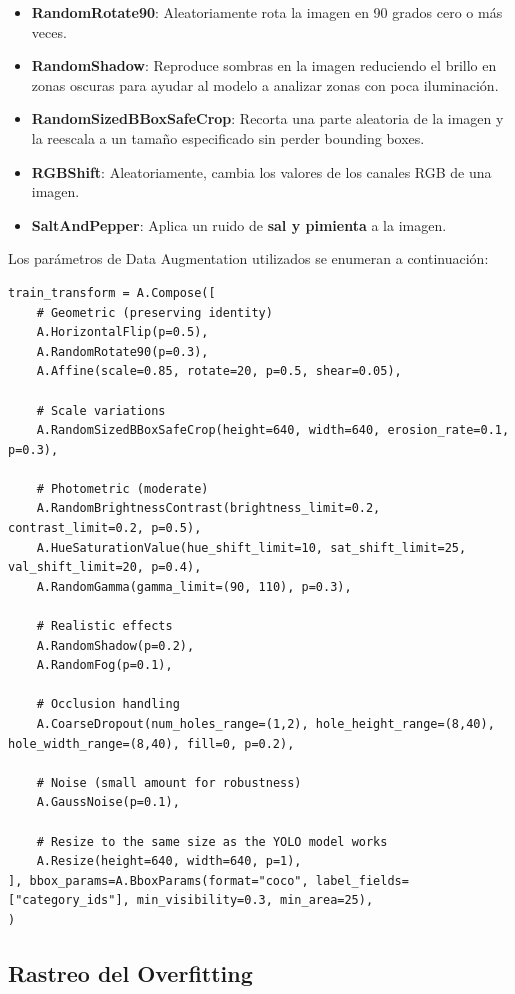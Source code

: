 \documentclass[12pt,a4paper,onecolumn,oneside]{report}
\begin{document}
\begin{itemize}
    \item \textbf{RandomRotate90}: Aleatoriamente rota la imagen en 90 grados cero o más veces.
    \item \textbf{RandomShadow}: Reproduce sombras en la imagen reduciendo el brillo en zonas oscuras para ayudar al modelo a analizar zonas con poca iluminación.
    \item \textbf{RandomSizedBBoxSafeCrop}: Recorta una parte aleatoria de la imagen y la reescala a un tamaño especificado sin perder bounding boxes.
    \item \textbf{RGBShift}: Aleatoriamente, cambia los valores de los canales RGB de una imagen.
    \item \textbf{SaltAndPepper}: Aplica un ruido de \textbf{sal y pimienta} a la imagen.
\end{itemize}

Los parámetros de Data Augmentation utilizados se enumeran a continuación:
\begin{lstlisting}
train_transform = A.Compose([
    # Geometric (preserving identity)
    A.HorizontalFlip(p=0.5),
    A.RandomRotate90(p=0.3),
    A.Affine(scale=0.85, rotate=20, p=0.5, shear=0.05),
    
    # Scale variations
    A.RandomSizedBBoxSafeCrop(height=640, width=640, erosion_rate=0.1, p=0.3),
    
    # Photometric (moderate)
    A.RandomBrightnessContrast(brightness_limit=0.2, contrast_limit=0.2, p=0.5),
    A.HueSaturationValue(hue_shift_limit=10, sat_shift_limit=25, val_shift_limit=20, p=0.4),
    A.RandomGamma(gamma_limit=(90, 110), p=0.3),
    
    # Realistic effects
    A.RandomShadow(p=0.2),
    A.RandomFog(p=0.1),
    
    # Occlusion handling
    A.CoarseDropout(num_holes_range=(1,2), hole_height_range=(8,40), hole_width_range=(8,40), fill=0, p=0.2),
    
    # Noise (small amount for robustness)
    A.GaussNoise(p=0.1),

    # Resize to the same size as the YOLO model works
    A.Resize(height=640, width=640, p=1),
], bbox_params=A.BboxParams(format="coco", label_fields=["category_ids"], min_visibility=0.3, min_area=25),
)
\end{lstlisting}

\subsection{Rastreo del Overfitting}
\end{document}
